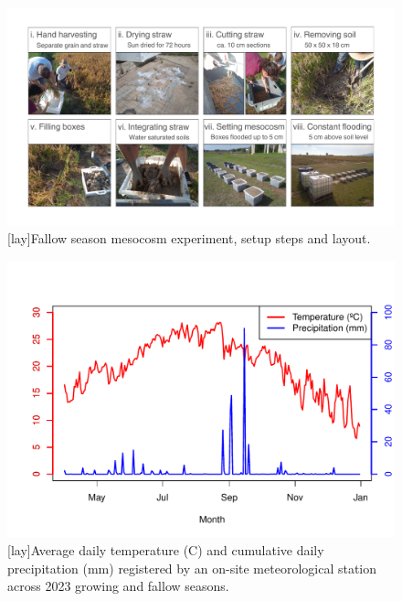 
\begin{figure} [ht]
\captionsetup{justification=justified}
	\centering 
	\includegraphics[scale=0.3, center]{Figures/Chapter_2/CERESTRES_meso_2023.pdf}
	[lay]{Fallow season mesocosm experiment, setup steps and layout.}  
	\label{meso}
\end{figure}


\begin{figure} [ht]
\captionsetup{justification=justified}
	\centering 
	\includegraphics[scale=0.8, center]{Figures/Chapter_2/Meteocat_temp.pdf}
	[lay]{Average daily temperature (\degree C) and cumulative daily precipitation (mm) registered by an on-site meteorological station across 2023 growing and fallow seasons.}  
	\label{temp}
\end{figure}

